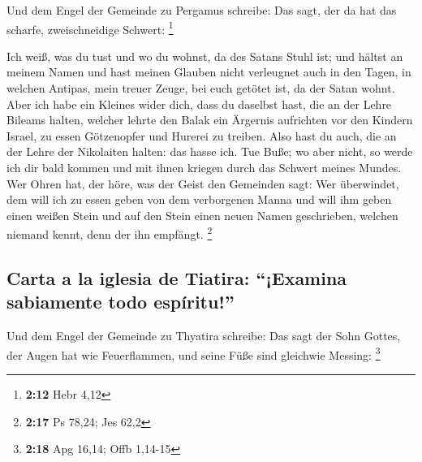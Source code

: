  Und dem Engel der Gemeinde zu Pergamus schreibe: Das
sagt, der da hat das scharfe, zweischneidige Schwert: \footnote{\textbf{2:12}
  Hebr 4,12}

 Ich weiß, was du tust und wo du wohnst, da des Satans
Stuhl ist; und hältst an meinem Namen und hast meinen Glauben nicht
verleugnet auch in den Tagen, in welchen Antipas, mein treuer Zeuge, bei
euch getötet ist, da der Satan wohnt.  Aber ich habe ein
Kleines wider dich, dass du daselbst hast, die an der Lehre Bileams
halten, welcher lehrte den Balak ein Ärgernis aufrichten vor den Kindern
Israel, zu essen Götzenopfer und Hurerei zu treiben. 
Also hast du auch, die an der Lehre der Nikolaiten halten: das hasse
ich.  Tue Buße; wo aber nicht, so werde ich dir bald
kommen und mit ihnen kriegen durch das Schwert meines Mundes.
 Wer Ohren hat, der höre, was der Geist den Gemeinden
sagt: Wer überwindet, dem will ich zu essen geben von dem verborgenen
Manna und will ihm geben einen weißen Stein und auf den Stein einen
neuen Namen geschrieben, welchen niemand kennt, denn der ihn empfängt.
\footnote{\textbf{2:17} Ps 78,24; Jes 62,2}

\hypertarget{carta-a-la-iglesia-de-tiatira-examina-sabiamente-todo-espuxedritu}{%
\subsection{Carta a la iglesia de Tiatira: ``¡Examina sabiamente todo
espíritu!''}\label{carta-a-la-iglesia-de-tiatira-examina-sabiamente-todo-espuxedritu}}

 Und dem Engel der Gemeinde zu Thyatira schreibe: Das
sagt der Sohn Gottes, der Augen hat wie Feuerflammen, und seine Füße
sind gleichwie Messing: \footnote{\textbf{2:18} Apg 16,14; Offb 1,14-15}

